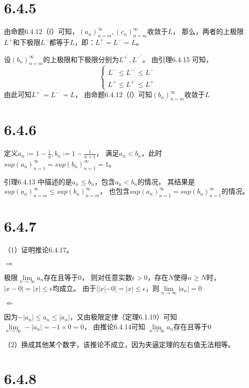 \documentclass{article}
\theoremstyle{mystyle}
\begin{document}
\section*{6.4.5}

由命题6.4.12（f）可知，$(a_n)_{n=m}^\infty,(c_n)_{n=m}^\infty$收敛于$L$，
那么，两者的上极限$L^+$和下极限$L^-$都等于$L$，即：$L^+ = L^- = L$。

设$(b_n)_{n=m}^\infty$的上极限和下极限分别为$L^{+^\prime},L^{-^\prime}$。
由引理6.4.15 可知，
\begin{equation}
  \begin{cases*}
    L^- \leq L^{-^\prime} \leq L^- \\
    L^+ \leq L^{+^\prime} \leq L^+
  \end{cases*}
\end{equation}
由此可知$L^{+^\prime}=L^{-^\prime}=L$，
由命题6.4.12（f）可知$(b_n)_{n=m}^\infty$收敛于$L$

\section*{6.4.6}

定义$a_n := 1 - \frac{1}{n}, b_n := 1 - \frac{1}{n+1}$，
满足$a_n < b_n$，此时$sup(a_n)_{n=1}^\infty=sup(b_n)_{n=1}^\infty=1$。

引理6.4.13 中描述的是$a_n \leq b_n$，包含$a_n < b_n$的情况，
其结果是$sup(a_n)_{n=m}^\infty \leq sup(b_n)_{n=m}^\infty$，
也包含$sup(a_n)_{n=1}^\infty=sup(b_n)_{n=1}^\infty$的情况。

\section*{6.4.7}

（1）证明推论6.4.17。

\textbf{$\Rightarrow$}

极限$\lim \limits_{n \rightarrow \infty}a_n$存在且等于$0$，
则对任意实数$\epsilon > 0$，存在$N$使得$n \geq N$时，$|x - 0| = |x| \leq \epsilon$均成立。
由于$||x|-0| = |x| \leq \epsilon$，则$\lim \limits_{n \rightarrow \infty}|a_n| = 0$

\textbf{$\Leftarrow$}

因为$-|a_n| \leq a_n \leq |a_n|$，又由极限定律（定理6.1.19）可知
$\lim \limits_{n \rightarrow \infty}-|a_n|=-1 \times 0 = 0$，
由推论6.4.14可知 $\lim \limits_{n \rightarrow \infty}a_n$存在且等于$0$

（2）换成其他某个数字，该推论不成立，因为夹逼定理的左右值无法相等。

\section*{6.4.8}
\end{document}
